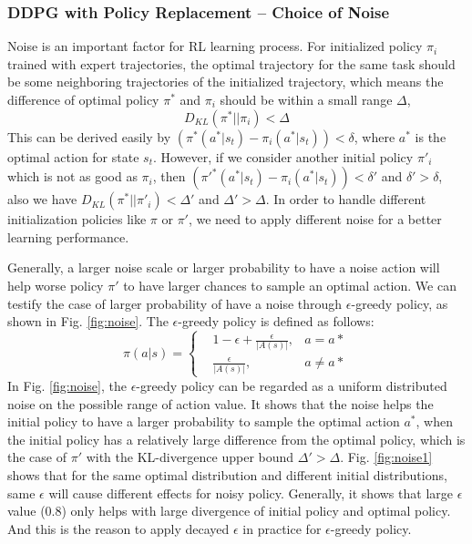 \documentclass{article}
\begin{document}
\subsubsection{DDPG with Policy Replacement -- Choice of Noise}
Noise is an important factor for RL learning process. For initialized policy $\pi_i$ trained with expert trajectories, the optimal trajectory for the same task should be some neighboring trajectories of the initialized trajectory, which means the difference of optimal policy $\pi^*$ and $\pi_i$ should be within a small range $\Delta$,
\begin{equation}
	D_{KL}(\pi^*||\pi_i)<\Delta
\end{equation}
This can be derived easily by $(\pi^*(a^*|s_t)- \pi_i(a^*|s_t))<\delta$, where $a^*$ is the optimal action for state $s_t$. However, if we consider another initial policy $\pi'_i$ which is not as good as $\pi_i$, then $(\pi'^*(a^*|s_t)- \pi_i(a^*|s_t))<\delta'$ and $\delta'>\delta$, also we have $D_{KL}(\pi^*||\pi'_i)<\Delta'$ and $\Delta'>\Delta$. In order to handle different initialization policies like $\pi$ or $\pi'$, we need to apply different noise for a better learning performance.

Generally, a larger noise scale or larger probability to have a noise action will help worse policy $\pi'$ to have larger chances to sample an optimal action. We can testify the case of larger probability of have a noise through $\epsilon$-greedy policy, as shown in Fig. \ref{fig:noise}. The $\epsilon$-greedy policy is defined as follows:
\begin{equation}
\pi(a|s)=\left\{
\begin{aligned}
&1-\epsilon+\frac{\epsilon}{|A(s)|}, &a=a* \\
&\frac{\epsilon}{|A(s)|}, &a\neq a*
\end{aligned}
\right.
\end{equation}
In Fig. \ref{fig:noise}, the $\epsilon$-greedy policy can be regarded as a uniform distributed noise on the possible range of action value. It shows that the noise helps the initial policy to have a larger probability to sample the optimal action $a^*$, when the initial policy has a relatively large difference from the optimal policy, which is the case of $\pi'$ with the KL-divergence upper bound  $\Delta'>\Delta$. Fig. \ref{fig:noise1} shows that for the same optimal distribution and different initial distributions, same $\epsilon$ will cause different effects for noisy policy. Generally, it shows that large $\epsilon$ value (0.8) only helps with large divergence of initial policy and optimal policy. And this is the reason to apply decayed $\epsilon$ in practice for $\epsilon$-greedy policy.
\end{document}
